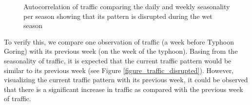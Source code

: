 \begin{figure}[h] 
\centering
    \centering
      \captionsetup{justification=centering}
    \hfill
    \caption{Autocorrelation of traffic comparing the daily and weekly seasonality per season showing that its pattern is disrupted during the wet season}
    \label{figure_autocorr_traffic_season}
\end{figure}




To verify this, we compare one observation of traffic (a week before Typhoon Goring) with its previous week (on the week of the typhoon). Basing from the seasonality of traffic, it is expected that the current traffic pattern would be similar to its previous week (see Figure \ref{figure_traffic_disrupted}). However, visualizing the current traffic pattern with its previous week, it could be observed that there is a significant increase in traffic as compared with the previous week of traffic.

